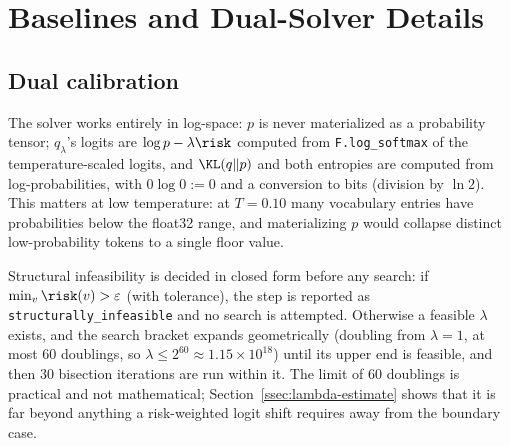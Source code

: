 \section{Baselines and Dual-Solver Details}
\label{app:baselines}

\subsection{Dual calibration}
\label{ssec:dual-fix}
The solver works entirely in log-space: $p$ is never materialized as a probability tensor; $q_\lambda$'s logits are $\log p-\lambda\risk$ computed from \texttt{F.log\_\allowbreak{}softmax} of the temperature-scaled logits, and $\KL(q\Vert p)$ and both entropies are computed from log-probabilities, with $0\log0:=0$ and a conversion to bits (division by $\ln2$). This matters at low temperature: at $T{=}0.10$ many vocabulary entries have probabilities below the float32 range, and materializing $p$ would collapse distinct low-probability tokens to a single floor value.

Structural infeasibility is decided in closed form before any search: if $\min_v\risk(v)>\varepsilon$ (with tolerance), the step is reported as \texttt{structurally\_\allowbreak{}infeasible} and no search is attempted. Otherwise a feasible $\lambda$ exists, and the search bracket expands geometrically (doubling from $\lambda{=}1$, at most 60 doublings, so $\lambda\le2^{60}\approx1.15\times10^{18}$) until its upper end is feasible, and then 30 bisection iterations are run within it. The limit of 60 doublings is practical and not mathematical; Section~\ref{ssec:lambda-estimate} shows that it is far beyond anything a risk-weighted logit shift requires away from the boundary case.

